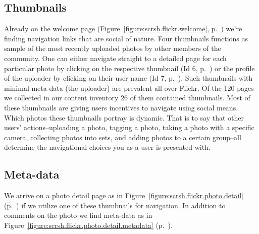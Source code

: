 
\subsection{Thumbnails}

Already on the welcome page (Figure~\ref{figure:scrsh.flickr.welcome},
p.~\pageref{figure:scrsh.flickr.welcome})
we're finding navigation links that are social of
nature. Four thumbnails functions as sample of the most recently uploaded
photos by other members of the community. One can either navigate straight to
a detailed page for each particular photo by clicking on the respective
thumbnail (Id 6, p.~\pageref{table:flickr.content.inventory.6})
or the profile of the uploader by clicking on their user
name (Id 7, p.~\pageref{table:flickr.content.inventory.7}). Such thumbnails
with minimal meta data (the uploader) are prevalent all over Flickr. Of the
120 pages we collected in our content inventory 26 of them contained
thumbnails. Most of these thumbnails%
are giving users incentives to navigate using social means.
Which photos these thumbnails portray is dynamic. That is to say that other
users' actions--uploading a photo, tagging a photo, taking a photo with a
specific camera, collecting photos into sets, and adding photos to a certain
group--all determine the navigational choices you as a user is
presented with.

\subsection{Meta-data}
We arrive on a photo detail page as in
Figure~\ref{figure:scrsh.flickr.photo.detail}
(p.~\pageref{figure:scrsh.flickr.photo.detail})
if we utilize one of these thumbnails for navigation. In addition to comments
on the photo we find meta-data as in 
Figure~\ref{figure:scrsh.flickr.photo.detail.metadata}
(p.~\pageref{figure:scrsh.flickr.photo.detail.metadata}).

